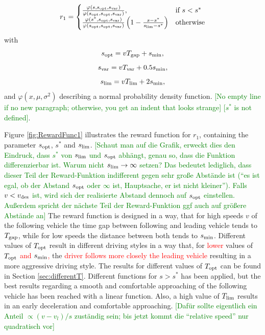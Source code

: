 \documentclass[review]{elsarticle}
\providecommand{\red}[1]{\textcolor{red}{#1}}
\providecommand{\green}[1]{\textcolor{green}{#1}}
\providecommand{\martin}[1]{\red{#1}} %
\providecommand{\martinc}[1]{\green{[#1]}} %
\providecommand{\sub}[1]{_{\text{{\scriptsize \hspace{-0.0ex}#1}}}}
\providecommand{\3}{{\ss}}
\begin{document}
\begin{equation}
\label{eq:r1}
r_1  = 
\begin{cases}
\frac{\varphi(s,  s_{\rm opt},  s_{\rm var})}{\varphi( s_{\rm opt},  s_{\rm opt},  s_{\rm var})},& \text{if } s < s^*\\
\frac{\varphi(s^*,  s_{\rm opt},  s_{\rm var})}{\varphi( s_{\rm opt},  s_{\rm opt},  s_{\rm var})} \left(1-\frac{s-s^*}{s_{\rm lim} - s^*}\right)              & \text{otherwise}
\end{cases}
\end{equation}
with
\begin{equation}
\label{eq:r11}
s_{\rm opt} = vT_{\rm gap} + s_{\rm min},
\end{equation}
\begin{equation}
\label{eq:r12}
s_{\rm var} = vT_{\rm var} + 0.5s_{\rm min},
\end{equation}
\begin{equation}
\label{eq:r13}
s_{\rm lim} = vT_{\rm lim} + 2s_{\rm min},
\end{equation}
%
and $\varphi(x,\mu,\sigma^2)$ describing a normal probability density
function. \martinc{No empty line if no new paragraph; otherwise, you get an
  indent that looks strange] [$s^*$ is not defined}.

Figure \ref{fig:RewardFunc1} illustrates the reward function for
$r_1$, containing the parameter $s_{\rm opt}$, $s^*$ and $s_{\rm
  lim}$. \martinc{Schaut man auf die Grafik, erweckt dies den
    Eindruck, dass $s^*$ von $s\sub{lim}$ und $s_{\rm opt}$ abh\"angt,
    genau so, dass die Funktion differenzierbar ist. Warum nicht
    $s\sub{lim}\to \infty$ setzen? Das bedeutet lediglich, dass
    dieser Teil der Reward-Funktion indifferent gegen sehr gro\3e
    Abst\"ande ist (``es ist egal, ob der Abstand $s\sub{opt}$ oder
    $\infty$ ist, Hauptsache, er ist nicht kleiner''). Falls
    $v<v\sub{des}$ ist, wird sich der realisierte Abstand dennoch auf
    $s\sub{opt}$ einstellen. Au\3erdem spricht der n\"achste Teil der
    Reward-Funktion ggf auch auf gr\"o\3ere Abst\"ande an} 
The reward function is designed in a way, that for high speeds $v$
of the following vehicle the time gap between following and leading
vehicle tends to $T_{\rm gap}$, while for low speeds the distance
between both tends to $s_{\rm min}$. Different values of $T_{\rm opt}$
result in different driving styles in a way that, for \martin{lower} values of
$T_{\rm opt}$ \martin{and $s\sub{min}$,} the \martin{driver follows
  more closely the leading vehicle} resulting in a more aggressive
driving style. The results for different values of $T_{\rm opt}$ can
be found in Section \ref{sec:differentT}. Different functions for $ s
> s^*$ has been applied, but the best results regarding a smooth and
comfortable approaching of the following vehicle has been reached with
a linear function. Also, a high value of $T_{\rm lim}$ results in an
early deceleration and comfortable approaching. \martinc{Daf\"ur
  sollte eigentlich ein Anteil $\propto (v-v_l)/s$ zust\"andig sein;
  bis jetzt kommt die ``relative speed'' nur quadratisch vor} 
\end{document}
